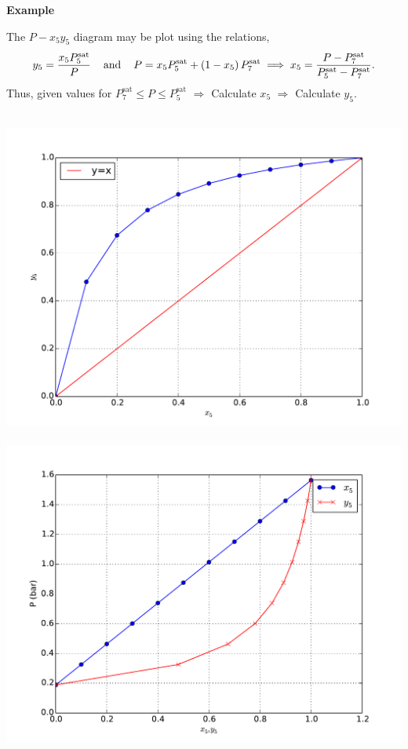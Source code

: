 \begin{MyExample}{\begin{center}{\bf Example}\end{center}}
           The $P-x_{5}y_{5}$ diagram may be plot using the relations,
           \begin{displaymath}
               y_{5} = \displaystyle\frac{x_{5}P_{5}^{\text{sat}}}{P}\;\;\;\text{ and }\;\;\; P = x_{5}P_{5}^{\text{sat}} + \left(1-x_{5}\right)P_{7}^{\text{sat}} \;\Longrightarrow\; x_{5} = \displaystyle\frac{P-P_{7}^{\text{sat}}}{P_{5}^{\text{sat}}-P_{7}^{\text{sat}}}.
           \end{displaymath}
           Thus, given values for $P_{7}^{\text{sat}}\leq P \leq P_{5}^{\text{sat}}$ $\Rightarrow$ Calculate $x_{5}$  $\Rightarrow$ Calculate $y_{5}$.
           \bigskip
           
           \hbox{
             \includegraphics[width=.5\linewidth,clip]{./Figs/Mod4Ex1}
             \includegraphics[width=.5\linewidth,clip]{./Figs/Mod4Ex1b}}
           
   \end{MyExample} 

